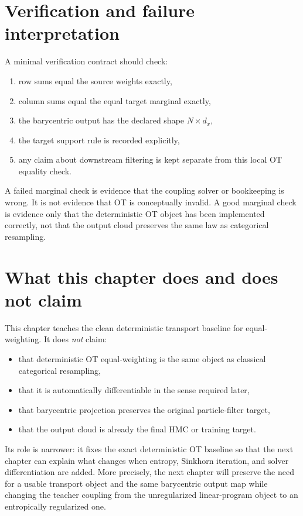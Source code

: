 \section{Verification and failure interpretation}
\label{sec:bf-ot-baseline-verification}

A minimal verification contract should check:
\begin{enumerate}[label=(\arabic*)]
  \item row sums equal the source weights exactly,
  \item column sums equal the equal target marginal exactly,
  \item the barycentric output has the declared shape \(N\times d_x\),
  \item the target support rule is recorded explicitly,
  \item any claim about downstream filtering is kept separate from this local OT
  equality check.
\end{enumerate}

A failed marginal check is evidence that the coupling solver or bookkeeping is
wrong.  It is not evidence that OT is conceptually invalid.  A good marginal check
is evidence only that the deterministic OT object has been implemented correctly,
not that the output cloud preserves the same law as categorical resampling.

\section{What this chapter does and does not claim}
\label{sec:bf-ot-baseline-boundary}

This chapter teaches the clean deterministic transport baseline for equal-
weighting.  It does \emph{not} claim:
\begin{itemize}
  \item that deterministic OT equal-weighting is the same object as classical
    categorical resampling,
  \item that it is automatically differentiable in the sense required later,
  \item that barycentric projection preserves the original particle-filter target,
  \item that the output cloud is already the final HMC or training target.
\end{itemize}
Its role is narrower: it fixes the exact deterministic OT baseline so that the
next chapter can explain what changes when entropy, Sinkhorn iteration, and
solver differentiation are added.  More precisely, the next chapter will preserve
the need for a usable transport object and the same barycentric output map while
changing the teacher coupling from the unregularized linear-program object to an
entropically regularized one.

\FloatBarrier
